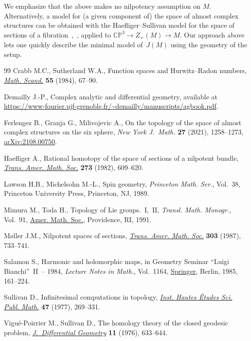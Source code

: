 \documentclass[11pt]{article}
\numberwithin{equation}{section}
\newcommand{\CP}{\mathbb{CP}}
\numberwithin{equation}{section}
\begin{document}
We emphasize that the above makes no nilpotency assumption on $M$. Alternatively, a model for (a given component of) the space of almost complex structures can be obtained with the Haefliger--Sullivan model for the space of sections of a fibration~\cite[Section~11]{S77},~\cite{H82}, applied to $\CP^3 \to Z_+(M) \to M$. Our approach above lets one quickly describe the minimal model of~$J(M)$ using the geometry of the setup.
\begin{thebibliography}{99}
Crabb M.C., Sutherland W.A., Function spaces and {H}urwitz--{R}adon numbers,
 \href{https://doi.org/10.7146/math.scand.a-12068}{\textit{Math. Scand.}} \textbf{55} (1984), 67--90.

Demailly J.-P., Complex analytic and differential geometry, available at
 \url{https://www-fourier.ujf-grenoble.fr/~demailly/manuscripts/agbook.pdf}.

Ferlengez B., Granja G., Milivojevic A., On the topology of the space of almost
 complex structures on the six sphere, \textit{New York J.~Math.} \textbf{27}
 (2021), 1258--1273, \href{https://arxiv.org/abs/2108.00750}{arXiv:2108.00750}.

Haefliger A., Rational homotopy of the space of sections of a nilpotent bundle,
 \href{https://doi.org/10.2307/1999931}{\textit{Trans. Amer. Math. Soc.}} \textbf{273} (1982), 609--620.

Lawson H.B., Michelsohn M.-L., Spin geometry, \textit{Princeton Math. Ser.},
 Vol.~38, Princeton University Press, Princeton, NJ, 1989.

Mimura M., Toda H., Topology of {L}ie groups.~{I},~{II}, \textit{Transl. Math.
 Monogr.}, Vol.~91, \href{https://doi.org/10.1090/mmono/091}{Amer. Math. Soc.}, Providence, RI, 1991.

M{\o}ller J.M., Nilpotent spaces of sections, \href{https://doi.org/10.2307/2000693}{\textit{Trans. Amer. Math. Soc.}}
 \textbf{303} (1987), 733--741.

Salamon S., Harmonic and holomorphic maps, in Geometry Seminar ``{L}uigi
 {B}ianchi''~{II}~-- 1984, \textit{Lecture Notes in Math.}, Vol.~1164,
 \href{https://doi.org/10.1007/BFb0081912}{Springer}, Berlin, 1985, 161--224.

Sullivan D., Infinitesimal computations in topology, \href{https://doi.org/10.1007/BF02684341}{\textit{Inst. Hautes
 \'Etudes Sci. Publ. Math.}} \textbf{47} (1977), 269--331.

Vigu\'e-Poirrier M., Sullivan D., The homology theory of the closed geodesic
 problem, \href{https://doi.org/10.4310/jdg/1214433729}{\textit{J.~Differential Geometry}} \textbf{11} (1976), 633--644.

\end{thebibliography}
\end{document}
